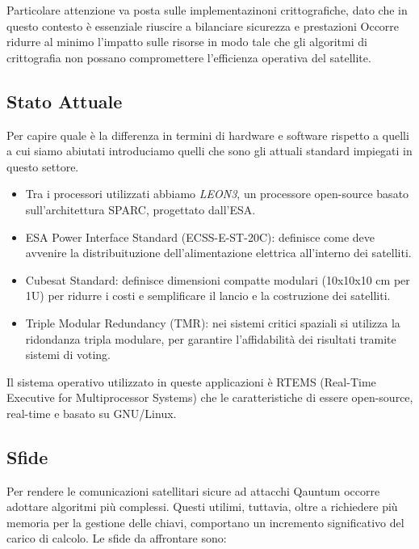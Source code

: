 \noindent
Particolare attenzione va posta sulle implementazinoni crittografiche, dato che in questo contesto è essenziale riuscire a bilanciare sicurezza e prestazioni
Occorre ridurre al minimo l'impatto sulle risorse in modo tale che gli algoritmi di crittografia non possano compromettere l'efficienza operativa del satellite.

\subsection{Stato Attuale}

Per capire quale è la differenza in termini di hardware e software rispetto a quelli a cui siamo abiutati 
introduciamo quelli che sono gli attuali standard impiegati in questo settore.

\begin{itemize}
    \item Tra i processori utilizzati abbiamo \textit{LEON3}, un processore open-source basato sull'architettura SPARC, progettato dall'ESA. 
    \item ESA Power Interface Standard (ECSS-E-ST-20C): definisce come deve avvenire la distribuituzione dell'alimentazione elettrica all'interno dei satelliti.
    \item Cubesat Standard: definisce dimensioni compatte modulari (10x10x10 cm per 1U) per ridurre i costi e semplificare il lancio e la costruzione dei satelliti.
    \item Triple Modular Redundancy (TMR): nei sistemi critici spaziali si utilizza la ridondanza tripla modulare, per garantire l'affidabilità dei risultati tramite sistemi di voting.
\end{itemize}
\noindent
Il sistema operativo utilizzato in queste applicazioni è RTEMS (Real-Time Executive for Multiprocessor Systems) che le caratteristiche di essere open-source, real-time e basato su GNU/Linux.

\subsection{Sfide}
\noindent
Per rendere le comunicazioni satellitari sicure ad attacchi Qauntum occorre adottare algoritmi più complessi.
Questi utilimi, tuttavia, oltre a richiedere più memoria per la gestione delle chiavi,
comportano un incremento significativo del carico di calcolo. Le sfide da affrontare sono:

